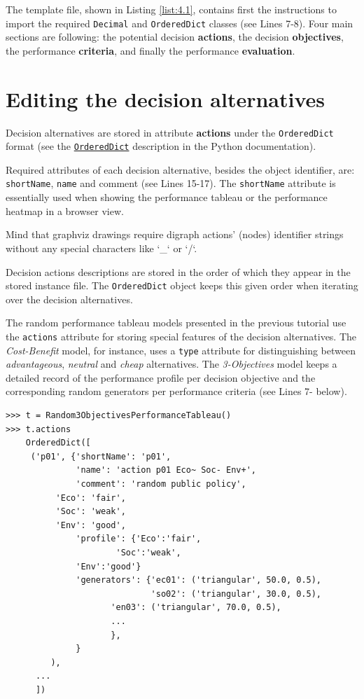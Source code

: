 The template file, shown in Listing \ref{list:4.1}, contains first the instructions to import the required {\tt Decimal} and {\tt OrderedDict} classes (see Lines 7-8). Four main sections are following: the potential decision {\bf actions}, the decision \textbf{objectives}, the performance \textbf{criteria}, and finally the performance \textbf{evaluation}.  

\section{Editing the decision alternatives}
\label{sec:4.2}

Decision alternatives are stored in attribute \textbf{actions} under the \texttt{OrderedDict} format (see the \href{https://docs.python.org/3/library/collections.html}{{\tt OrderedDict}} description in the Python documentation).

Required attributes of each decision alternative, besides the object identifier,  are: \texttt{shortName}, \texttt{name} and \texttt{}comment (see Lines 15-17). The \texttt{shortName} attribute is essentially used when showing the performance tableau or the performance heatmap in a browser view.

Mind that graphviz drawings require digraph actions' (nodes) identifier strings without any special characters like `\_` or `/`.

Decision actions descriptions are stored in the order of which they appear in the stored instance file. The \texttt{OrderedDict} object keeps this given order when iterating over the decision alternatives.

The random performance tableau models presented in the previous tutorial use the \texttt{actions} attribute for storing special features of the decision alternatives. The \emph{Cost-Benefit} model, for instance, uses a \texttt{type} attribute for distinguishing between \emph{advantageous}, \emph{neutral} and \emph{cheap} alternatives. The \emph{3-Objectives} model keeps a detailed record of the performance profile per decision objective and the corresponding random generators per performance criteria (see Lines 7- below).
\begin{lstlisting}[basicstyle=\footnotesize]
>>> t = Random3ObjectivesPerformanceTableau()
>>> t.actions
    OrderedDict([
     ('p01', {'shortName': 'p01',
              'name': 'action p01 Eco~ Soc- Env+',
              'comment': 'random public policy',
	      'Eco': 'fair',
	      'Soc': 'weak',
	      'Env': 'good',
              'profile': {'Eco':'fair',
	                  'Soc':'weak',
			  'Env':'good'}
              'generators': {'ec01': ('triangular', 50.0, 0.5),
                             'so02': ('triangular', 30.0, 0.5),
		             'en03': ('triangular', 70.0, 0.5),
		             ...
		             },
              }
         ),
      ...
      ])
\end{lstlisting}

